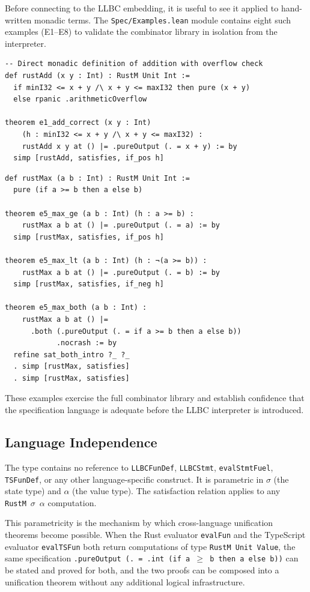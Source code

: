 Before connecting \ProgramSpec to the LLBC embedding, it is useful to see it
applied to hand-written monadic terms. The \texttt{Spec/Examples.lean} module
contains eight such examples (E1--E8) to validate the combinator library in
isolation from the interpreter.

\begin{lstlisting}[caption={E1: rustAdd satisfies its specification.},label={lst:e1}]
-- Direct monadic definition of addition with overflow check
def rustAdd (x y : Int) : RustM Unit Int :=
  if minI32 <= x + y /\ x + y <= maxI32 then pure (x + y)
  else rpanic .arithmeticOverflow

theorem e1_add_correct (x y : Int)
    (h : minI32 <= x + y /\ x + y <= maxI32) :
    rustAdd x y at () |= .pureOutput (. = x + y) := by
  simp [rustAdd, satisfies, if_pos h]
\end{lstlisting}

\begin{lstlisting}[caption={E5: rustMax with two-case specification.},label={lst:e5}]
def rustMax (a b : Int) : RustM Unit Int :=
  pure (if a >= b then a else b)

theorem e5_max_ge (a b : Int) (h : a >= b) :
    rustMax a b at () |= .pureOutput (. = a) := by
  simp [rustMax, satisfies, if_pos h]

theorem e5_max_lt (a b : Int) (h : ¬(a >= b)) :
    rustMax a b at () |= .pureOutput (. = b) := by
  simp [rustMax, satisfies, if_neg h]

theorem e5_max_both (a b : Int) :
    rustMax a b at () |=
      .both (.pureOutput (. = if a >= b then a else b))
            .nocrash := by
  refine sat_both_intro ?_ ?_
  . simp [rustMax, satisfies]
  . simp [rustMax, satisfies]
\end{lstlisting}

These examples exercise the full combinator library and establish confidence
that the specification language is adequate before the LLBC interpreter is
introduced.

\subsection{Language Independence}

The \ProgramSpec type contains no reference to \texttt{LLBCFunDef},
\texttt{LLBCStmt}, \texttt{evalStmtFuel}, \texttt{TSFunDef}, or any other
language-specific construct. It is parametric in $\sigma$ (the state type)
and $\alpha$ (the value type). The satisfaction relation applies to any
\texttt{RustM}~$\sigma$~$\alpha$ computation.

This parametricity is the mechanism by which cross-language unification
theorems become possible. When the Rust evaluator \texttt{evalFun} and the
TypeScript evaluator \texttt{evalTSFun} both return computations of type
\texttt{RustM Unit Value}, the same \ProgramSpec specification
\texttt{.pureOutput (. = .int (if a $\ge$ b then a else b))} can be stated
and proved for both, and the two proofs can be composed into a unification
theorem without any additional logical infrastructure.
